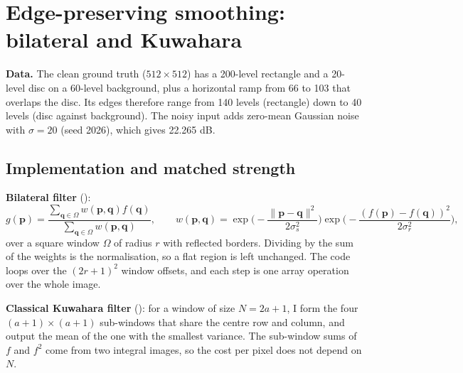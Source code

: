 \section{Edge-preserving smoothing: bilateral and Kuwahara}

\textbf{Data.} The clean ground truth  ($512\times512$) has a
200-level rectangle and a 20-level disc on a 60-level background, plus a
horizontal ramp from 66 to 103 that overlaps the disc. Its edges therefore range
from 140 levels (rectangle) down to 40 levels (disc against background). The
noisy input adds zero-mean Gaussian noise with $\sigma=20$ (seed 2026), which
gives 22.265 dB.

\subsection{Implementation and matched strength}

\textbf{Bilateral filter} \cite{tomasi} ():
\begin{equation}
g(\mathbf p)=\frac{\sum_{\mathbf q\in\Omega}w(\mathbf p,\mathbf q)f(\mathbf q)}{\sum_{\mathbf q\in\Omega}w(\mathbf p,\mathbf q)},\qquad
w(\mathbf p,\mathbf q)=\exp\!\Big(-\frac{\|\mathbf p-\mathbf q\|^2}{2\sigma_s^2}\Big)\exp\!\Big(-\frac{(f(\mathbf p)-f(\mathbf q))^2}{2\sigma_r^2}\Big),
\end{equation}
over a square window $\Omega$ of radius $r$ with reflected borders. Dividing by
the sum of the weights is the normalisation, so a flat region is left unchanged.
The code loops over the $(2r+1)^2$ window offsets, and each step is one array
operation over the whole image.

\textbf{Classical Kuwahara filter} \cite{kuwahara}
(): for a window of size $N=2a+1$, I form the
four $(a+1)\times(a+1)$ sub-windows that share the centre row and column, and
output the mean of the one with the smallest variance. The sub-window sums of $f$
and $f^2$ come from two integral images, so the cost per pixel does not depend on
$N$.

